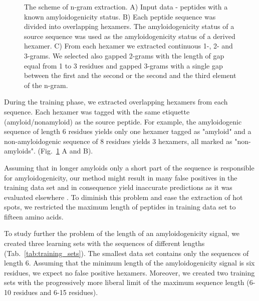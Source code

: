 \documentclass[a4,center,fleqn]{NAR}
\begin{document}
\begin{figure}[!tpb]
  \caption{The scheme of n-gram extraction. A) Input data - peptides with a 
known amyloidogenicity status. B) Each peptide sequence was divided into 
overlapping hexamers. The amyloidogenicity status of a source sequence was used 
as the amyloidogenicity status of a derived hexamer. C) From each hexamer we 
extracted continuous 1-, 2- and 3-grams. We selected also gapped 2-grams with 
the length of gap equal from 1 to 3 residues and gapped 3-grams with a single 
gap between the first and the second or the second and the third element of the 
n-gram.}
\label{fig:ngram_scheme}
\end{figure}

  During the training phase, we extracted overlapping hexamers from each sequence. 
%
%
%
Each hexamer was tagged with the same etiquette (amyloid/nonamyloid) as the 
source peptide. For example, the amyloidogenic sequence of length 6 residues 
yields only one 
%
%
%
%
%
%
%
%
%
hexamer tagged as "amyloid" and a non-amyloidogenic sequence of 8 residues yields 
3 hexamers, all marked as "non-amyloids". (Fig.~\ref{fig:ngram_scheme} A and B). 

  Assuming that in longer amyloids only a short part of the sequence is 
responsible for amyloidogenicity, our method might result in many false 
positives in the training data set and in consequence yield inaccurate 
predictions as it was evaluated elsewhere \citep{kotulska_amyloid_2013}. To 
diminish this problem and ease the extraction of hot spots, we restricted the 
maximum length of peptides in training data set to fifteen amino acids.

%
%
%

  To study further the problem of the length of an amyloidogenicity signal, we 
created three learning sets with the sequences of different lengths 
(Tab.~\ref{tab:training_sets}). The smallest data set contains only the 
sequences of length 6. Assuming that the minimum length of the amyloidogenicity 
signal is six residues, we expect no false positive hexamers. Moreover, we 
created two training sets with the progressively more liberal limit of the 
maximum sequence length (6-10 residues and 6-15 residues).
\end{document}
